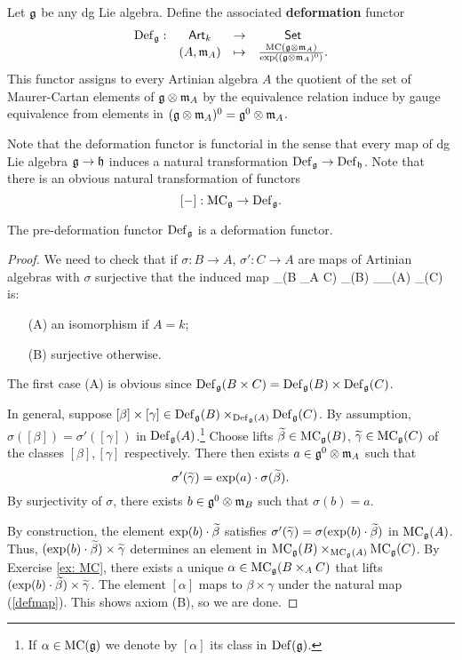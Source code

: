 \documentclass[11pt]{amsart}
\begin{document}
\begin{dfn}
Let $\fg$ be any dg Lie algebra.
Define the associated {\bf deformation} functor
\[
\begin{array}{cccc}
\Def_\fg : & \Art_k & \to & \Set \\
& (A,\fm_A) & \mapsto & \frac{\MC(\fg \tensor \fm_A)}{\exp((\fg \tensor \fm_A)^0)} .
\end{array}
\]
This functor assigns to every Artinian algebra $A$ the quotient of the set of Maurer-Cartan elements of $\fg \tensor \fm_A$ by the equivalence relation induce by gauge equivalence from elements in $(\fg \tensor \fm_A)^0 = \fg^0 \tensor \fm_A$. 
\end{dfn}

Note that the deformation functor is functorial in the sense that every map of dg Lie algebra $\fg \to \fh$ induces a natural transformation $\Def_\fg \to \Def_\fh$. 
Note that there is an obvious natural transformation of functors
\[
[-] : \MC_\fg \to \Def_\fg .
\] 


\begin{prop}
The pre-deformation functor $\Def_\fg$ is a deformation functor.
\end{prop}

\begin{proof}
We need to check that if $\sigma : B \to A$, $\sigma' : C \to A$ are maps of Artinian algebras with $\sigma$ surjective that the induced map
\beqn\label{defmap}
\Def_\fg (B \times_A C) \to \Def_\fg(B) \times_{\Def_\fg(A)} \Def_\fg(C)
\eeqn
is:
\begin{itemize}
\item[(A)] an isomorphism if $A = k$;
\item[(B)] surjective otherwise. 
\end{itemize} 
The first case (A) is obvious since $\Def_\fg(B \times C) = \Def_{\fg}(B) \times \Def_\fg(C)$. 

In general, suppose $[\beta] \times [\gamma] \in \Def_\fg(B) \times_{\Def_\fg(A)} \Def_\fg(C)$.
By assumption, $\sigma([\beta]) = \sigma'([\gamma])$ in $\Def_\fg(A)$.\footnote{If $\alpha \in \MC(\fg)$ we denote by $[\alpha]$ its class in $\Def(\fg)$.}
Choose lifts $\Tilde{\beta} \in \MC_\fg (B)$, $\Tilde{\gamma} \in \MC_\fg(C)$ of the classes $[\beta], [\gamma]$ respectively.
There then exists $a \in \fg^0 \tensor \fm_A$ such that 
\[
\sigma'(\Tilde{\gamma}) = \exp(a) \cdot \sigma(\Tilde{\beta}) .
\] 
By surjectivity of $\sigma$, there exists $b \in \fg^0 \tensor \fm_B$ such that $\sigma(b) = a$. 

By construction, the element $\exp(b) \cdot \Tilde{\beta}$ satisfies $\sigma'(\Tilde{\gamma}) = \sigma(\exp(b) \cdot \Tilde{\beta})$ in $\MC_\fg(A)$. 
Thus, $(\exp(b) \cdot \Tilde{\beta}) \times \Tilde{\gamma}$ determines an element in $\MC_\fg(B) \times_{\MC_\fg(A)} \MC_\fg(C)$.
By Exercise \ref{ex: MC}, there exists a unique $\alpha \in \MC_\fg (B \times_A C)$ that lifts $(\exp(b) \cdot \Tilde{\beta}) \times \Tilde{\gamma}$. 
The element $[\alpha]$ maps to $\beta \times \gamma$ under the natural map (\ref{defmap}).
This shows axiom (B), so we are done. 
\end{proof}
\end{document}
